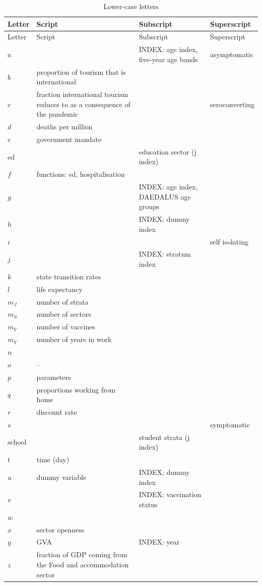\documentclass[
]{article}
\begin{document}
\begin{longtable}[]{@{}
  >{\centering\arraybackslash}p{}
  >{\centering\arraybackslash}p{}
  >{\centering\arraybackslash}p{}
  >{\centering\arraybackslash}p{}@{}}
\caption{Lower-case letters}\tabularnewline
\toprule
Letter & Script & Subscript & Superscript \\
\midrule
\endfirsthead
\toprule
Letter & Script & Subscript & Superscript \\
\midrule
\endhead
\(a\) & & INDEX: age index, five-year
age bands & asymptomatic \\
\(b\) & proportion of tourism that is
international & & \\
\(c\) & fraction international tourism
reduces to as a consequence of
the pandemic & & seroconverting \\
\(d\) & deaths per million & & \\
\(e\) & government mandate & & \\
\(\text{ed}\) & & education sector (j index) & \\
\(f\) & functions: sd, hospitalisation & & \\
\(g\) & & INDEX: age index, DAEDALUS age
groups & \\
\(h\) & & INDEX: dummy index & \\
\(i\) & & & self isolating \\
\(j\) & & INDEX: stratum index & \\
\(k\) & state transition rates & & \\
\(l\) & life expectancy & & \\
\(m_J\) & number of strata & & \\
\(m_S\) & number of sectors & & \\
\(m_V\) & number of vaccines & & \\
\(m_Y\) & number of years in work & & \\
\(n\) & & & \\
\(o\) & -- & & \\
\(p\) & parameters & & \\
\(q\) & proportions working from home & & \\
\(r\) & discount rate & & \\
\(s\) & & & symptomatic \\
\(\text{school}\) & & student strata (j index) & \\
\(t\) & time (day) & & \\
\(u\) & dummy variable & INDEX: dummy index & \\
\(v\) & & INDEX: vaccination status & \\
\(w\) & & & \\
\(x\) & sector openness & & \\
\(y\) & GVA & INDEX: year & \\
\(z\) & fraction of GDP coming from
the Food and accommodation
sector & & \\
\bottomrule
\end{longtable}
\end{document}

